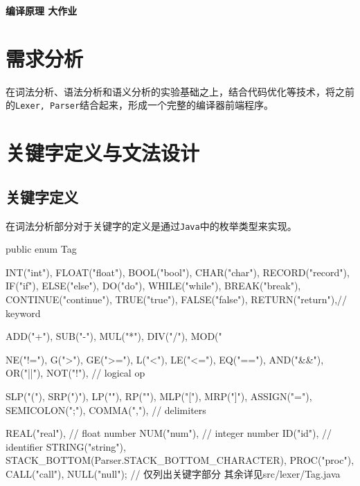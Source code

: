 \documentclass{ML}
\begin{document}
\maketitle

\tableofcontents
\newpage

\begin{center}
    \textbf{ 编译原理 大作业}
\end{center}

\section{需求分析}
在词法分析、语法分析和语义分析的实验基础之上，结合代码优化等技术，将之前的\texttt{Lexer, Parser}结合起来，形成一个完整的编译器前端程序。
\section{关键字定义与文法设计}
\subsection{关键字定义}
在词法分析部分对于关键字的定义是通过\texttt{Java}中的枚举类型来实现。
\begin{javacode}
public enum Tag {
    INT("int"), FLOAT("float"), BOOL("bool"), CHAR("char"), RECORD("record"), 
    IF("if"), ELSE("else"), DO("do"), WHILE("while"), 
    BREAK("break"), CONTINUE("continue"), TRUE("true"), 
    FALSE("false"), RETURN("return"),// keyword
    
    ADD("+"), SUB("-"), MUL("*"), DIV("/"), MOD("%

    NE("!="), G(">"), GE(">="), L("<"), LE("<="), EQ("=="), 
    AND("&&"), OR("||"), NOT("!"), // logical op
    
    SLP("("), SRP(")"), LP("{"), RP("}"), MLP("["), MRP("]"), 
    ASSIGN("="), SEMICOLON(";"), COMMA(","), // delimiters
    
    REAL("real"), // float number
    NUM("num"), // integer number
    ID("id"),  // identifier
    STRING("string"),
    STACK_BOTTOM(Parser.STACK_BOTTOM_CHARACTER),
    PROC("proc"), CALL("call"),
    NULL("null");
// 仅列出关键字部分 其余详见src/lexer/Tag.java
}
\end{javacode}
\end{document}

